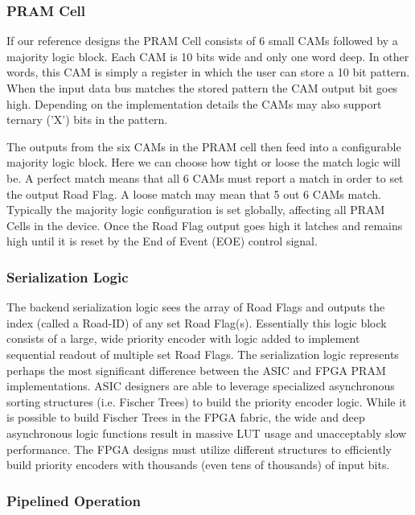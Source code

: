 \documentclass[letterpaper]{article}
\begin{document}
\subsubsection{PRAM Cell}

If our reference designs the PRAM Cell consists of 6 small CAMs followed by a majority logic block. Each CAM is 10 bits wide and only one word deep. In other words, this CAM is simply a register in which the user can store a 10 bit pattern. When the input data bus matches the stored pattern the CAM output bit goes high. Depending on the implementation details the CAMs may also support ternary ('X') bits in the pattern.

The outputs from the six CAMs in the PRAM cell then feed into a configurable majority logic block. Here we can choose how tight or loose the match logic will be. A perfect match means that all 6 CAMs must report a match in order to set the output Road Flag. A loose match may mean that 5 out 6 CAMs match. Typically the majority logic configuration is set globally, affecting all PRAM Cells in the device. Once the Road Flag output goes high it latches and remains high until it is reset by the End of Event (EOE) control signal.

\subsubsection{Serialization Logic}

The backend serialization logic sees the array of Road Flags and outputs the index (called a Road-ID) of any set Road Flag(s). Essentially this logic block consists of a large, wide priority encoder with logic added to implement sequential readout of multiple set Road Flags. The serialization logic represents perhaps the most significant difference between the ASIC and FPGA PRAM implementations. ASIC designers are able to leverage specialized asynchronous sorting structures (i.e. Fischer Trees) to build the priority encoder logic. While it is possible to build Fischer Trees in the FPGA fabric, the wide and deep asynchronous logic functions result in massive LUT usage and unacceptably slow performance. The FPGA designs must utilize different structures to efficiently build priority encoders with thousands (even tens of thousands) of input bits.

\subsubsection{Pipelined Operation}
\end{document}
